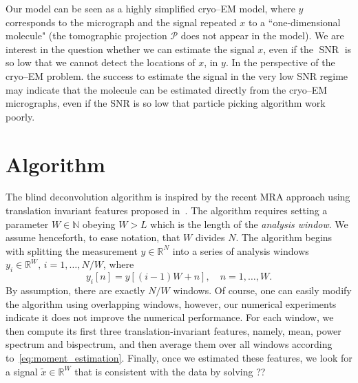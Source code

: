 \documentclass[journal]{IEEEtran}
\numberwithin{equation}{section}
\numberwithin{figure}{section}
\theoremstyle{plain}
\theoremstyle{definition}
\theoremstyle{remark}
\theoremstyle{plain}
\theoremstyle{remark}
\theoremstyle{plain}
\theoremstyle{plain}
\newcommand{\RN}{\mathbb{R}^N}
\newcommand{\SNR}{\operatorname{SNR}}
\begin{document}
 Our model can be seen as a highly simplified cryo--EM model, where $y$ corresponds to the micrograph and the signal repeated $x$ to a  ``one-dimensional molecule" (the tomographic projection $\mathcal{P}$ does not appear in the model). We are interest in the question whether we can estimate the signal $x$, even if the $\SNR$ is so low that we cannot detect the locations of $x$, in $y$. In the perspective of the cryo--EM problem. the success to estimate the signal in the very low SNR regime may indicate that the molecule can be estimated directly from the cryo--EM micrographs, even if the SNR is so low that particle picking algorithm work poorly. 



   

\section{Algorithm} \label{sec:algorithm}

The blind deconvolution algorithm is inspired by the recent MRA approach using translation invariant features proposed in~\cite{bendory2017bispectrum}. The algorithm requires setting a parameter $W\in\mathbb{N}$ obeying $W>L$  which is the length of the \emph{analysis window}. We assume henceforth, to ease notation, that $W$ divides $N$. 
The algorithm begins with splitting the measurement $y\in\RN$ into a series of analysis windows $y_i\in\mathbb{R}^W,\,i=1,\ldots,N/W$, where  
\begin{equation} \label{eq:analysis_window}
y_i[n] = y[(i-1)W + n] , \quad n=1,\ldots,W. 
\end{equation}
By assumption, there are exactly $N/W$ windows. Of course, one can easily modify the algorithm using overlapping windows, however, our numerical experiments indicate it does not improve the numerical performance.  For each window, we then compute its first three translation-invariant features, namely, mean, power spectrum and bispectrum, and then  average them over all windows according to~\eqref{eq:moment_estimation}. Finally, once we estimated these features, we look for a signal $\tilde{x}\in\mathbb{R}^W$ that is consistent with the data by solving ??
\end{document}

